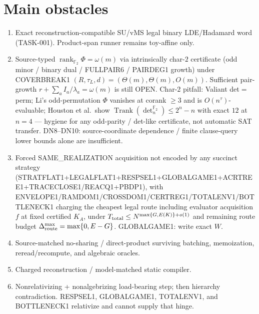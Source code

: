 \documentclass[11pt]{article}
\begin{document}
\section*{Main obstacles}
\begin{enumerate}
\item Exact reconstruction-compatible SU/vMS legal binary LDE/Hadamard word
(TASK-001). Product-span runner remains toy-affine only.
\item Source-typed $\operatorname{rank}_{\mathbb F_2}\Phi=\omega(m)$ via
intrinsically char-$2$ certificate (odd minor / binary dual / FULLPAIR6 /
PAIRDEG1 growth) under COVERBREAK1
$(R,\tau_L,d)=(\Theta(m),\Theta(m),O(m))$. Sufficient pair-growth
$r+\sum_a I_a/\lambda_a=\omega(m)$ is still OPEN. Char-$2$ pitfall: Valiant
det$=$perm; Li's odd-permutation $\Phi$ vanishes at corank $\ge 3$ and is
$O(n^{\tau})$-evaluable; Houston et al.\ show $\operatorname{Trank}(\det_n^{\mathbb F_2})\le 2^n-n$
with exact $12$ at $n=4$ --- hygiene for any odd-parity / det-like certificate,
not automatic SAT transfer. DN8--DN10: source-coordinate dependence / finite
clause-query lower bounds alone are insufficient.
\item Forced SAME\_REALIZATION acquisition not encoded by any succinct strategy
(STRATFLAT1+LEGALFLAT1+RESPSEL1+GLOBALGAME1+ACRTREE1+TRACECLOSE1/REACQ1+PBDP1),
with ENVELOPE1/RAMDOM1/CROSSDOM1/CERTREG1/TOTALENV1/BOTTLENECK1 charging the
cheapest legal route including evaluator acquisition $f$ at fixed certified
$K_A$, under $T_{\rm total}\le N^{\max\{G,E(K)\}+o(1)}$ and remaining route
budget $\Delta_{\rm route}^{\max}=\max\{0,E-G\}$. GLOBALGAME1: write exact $W$.
\item Source-matched no-sharing / direct-product surviving batching, memoization,
reread/recompute, and algebraic oracles.
\item Charged reconstruction / model-matched static compiler.
\item Nonrelativizing + nonalgebrizing load-bearing step; then hierarchy
contradiction. RESPSEL1, GLOBALGAME1, TOTALENV1, and BOTTLENECK1 relativize and
cannot supply that hinge.
\end{enumerate}
\end{document}
